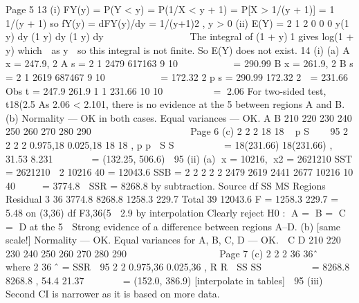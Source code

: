 \documentclass[a4paper,12pt]{article}
\begin{document}
\begin{emumerate}
Page 5
13 (i) FY(y) = P(Y < y) = P(1/X < y + 1) = P[X > 1/(y + 1)] = 1  1/(y + 1)
so fY(y) = dFY(y)/dy = 1/(y+1)2 , y > 0
(ii) E(Y) = 2 1 2
0 0 0
y(1 y) dy (1 y) dy (1 y) dy
  
  
       
The integral of (1 + y)1 gives log(1 + y) which 
  as y 
  so this
integral is not finite. So E(Y) does not exist.
14 (i) (a) A
x = 247.9, 2
A
s =
2 1 2479
617163
9 10
 
  
 
= 290.99
B
x = 261.9, 2
B
s =
2 1 2619
687467
9 10
 
  
 
= 172.32
2
p
s =
290.99 172.32
2

= 231.66
Obs t =
247.9 261.9
1 1
231.66
10 10

 
  
 
= 2.06
For two-sided test, t18(2.5%
As 2.06 < 2.101, there is no evidence at the 5%
between regions A and B.
(b)
Normality — OK in both cases.
Equal variances — OK.
A
B
210 220 230 240 250 260 270 280 290
     
     

Page 6
(c)
2
2
2 18
18
~ p
S


 95%
2 2
2 2
0.975,18 0.025,18
18 18
, p p
 S S 
     
=
18(231.66) 18(231.66)
,
31.53 8.231
 
 
 
= (132.25, 506.6)
 95%
(ii) (a) x = 10216, x2 = 2621210
SST = 2621210 
2 10216
40
= 12043.6
SSB =
2 2 2 2 2 2479 2619 2441 2677 10216
10 40
  
 = 3774.8
 SSR = 8268.8 by subtraction.
Source df SS MS
Regions
Residual
3
36
3774.8
8268.8
1258.3
229.7
Total 39 12043.6
F =
1258.3
229.7
= 5.48 on (3,36) df
F3,36(5%

2.9 by interpolation
Clearly reject H0 : A = B = C = D at the 5%
 Strong evidence of a difference between regions A–D.
(b)
[same scale!]
Normality — OK.
Equal variances for A, B, C, D — OK.
 C
D
210 220 230 240 250 260 270 280 290
 
 
 
   
  

Page 7
(c)
2
2
2 36
36ˆ
~



where 2 36ˆ = SSR
 95%
2 2
0.975,36 0.025,36
,
R R  SS SS 
     
=
8268.8 8268.8
,
54.4 21.37
 
 
 
= (152.0, 386.9) [interpolate in tables]
 95%
(iii) Second CI is narrower as it is based on more data.





\end{emumerate}
\end{document}
